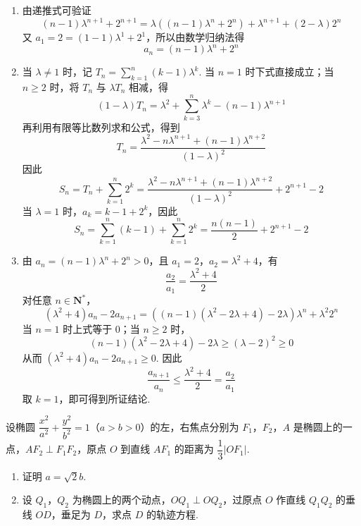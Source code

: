 \begin{solution}
\begin{enumerate}
\item 由递推式可验证
\[(n-1)\lambda^{n+1}+2^{n+1}=\lambda\left((n-1)\lambda^n+2^n\right)+\lambda^{n+1}+(2-\lambda)2^n\]
又 \(a_1=2=(1-1)\lambda^1+2^1\)，所以由数学归纳法得
\[a_n=(n-1)\lambda^n+2^n\]
\item 当 \(\lambda\neq1\) 时，记 \(T_n=\sum_{k=1}^{n}(k-1)\lambda^k\). 当 \(n=1\) 时下式直接成立；当 \(n\geqslant2\) 时，将 \(T_n\) 与 \(\lambda T_n\) 相减，得
\[
(1-\lambda)T_n=\lambda^2+\sum_{k=3}^{n}\lambda^k-(n-1)\lambda^{n+1}
\]
再利用有限等比数列求和公式，得到
\[
T_n=\dfrac{\lambda^2-n\lambda^{n+1}+(n-1)\lambda^{n+2}}{(1-\lambda)^2}
\]
因此
\[
S_n=T_n+\sum_{k=1}^{n}2^k
=\dfrac{\lambda^2-n\lambda^{n+1}+(n-1)\lambda^{n+2}}{(1-\lambda)^2}+2^{n+1}-2
\]
当 \(\lambda=1\) 时，\(a_k=k-1+2^k\)，因此
\[S_n=\sum_{k=1}^{n}(k-1)+\sum_{k=1}^{n}2^k=\dfrac{n(n-1)}{2}+2^{n+1}-2\]
\item 由 \(a_n=(n-1)\lambda^n+2^n>0\)，且 \(a_1=2\)，\(a_2=\lambda^2+4\)，有
\[\frac{a_2}{a_1}=\frac{\lambda^2+4}{2}\]
对任意 \(n\in\mathbf N^*\)，
\[(\lambda^2+4)a_n-2a_{n+1}=\left((n-1)(\lambda^2-2\lambda+4)-2\lambda\right)\lambda^n+\lambda^2 2^n\]
当 \(n=1\) 时上式等于 \(0\)；当 \(n\geq2\) 时，
\[(n-1)(\lambda^2-2\lambda+4)-2\lambda\geq(\lambda-2)^2\geq0\]
从而 \((\lambda^2+4)a_n-2a_{n+1}\geq0\). 因此
\[\frac{a_{n+1}}{a_n}\leq\frac{\lambda^2+4}{2}=\frac{a_2}{a_1}\]
取 \(k=1\)，即可得到所证结论.
\end{enumerate}
\end{solution}

\begin{problem}
设椭圆 \(\dfrac{x^2}{a^2} + \dfrac{y^2}{b^2} = 1\)（\(a > b > 0\)）的左，右焦点分别为 \(F_1\)，\(F_2\)，\(A\) 是椭圆上的一点，\(AF_2 \perp F_1F_2\)，原点 \(O\) 到直线 \(AF_1\) 的距离为 \(\dfrac{1}{3}|OF_1|\).

\begin{enumerate}
\item 证明 \(a = \sqrt{2}b\).
\item 设 \(Q_{1}\)，\(Q_{2}\) 为椭圆上的两个动点，\(OQ_{1} \perp OQ_{2}\)，过原点 \(O\) 作直线 \(Q_{1}Q_{2}\) 的垂线 \(OD\)，垂足为 \(D\)，求点 \(D\) 的轨迹方程.
\end{enumerate}
\end{problem}


